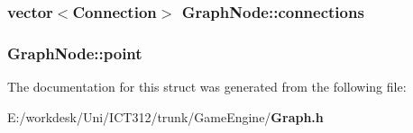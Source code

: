 \subsubsection[{connections}]{\setlength{\rightskip}{0pt plus 5cm}vector$<${\bf Connection}$>$ Graph\+Node\+::connections}\label{struct_graph_node_a82d4f743a136676d6027b5efff49555b}
\subsubsection[{point}]{ Graph\+Node\+::point}\label{struct_graph_node_ab3089f1db34b7e3bbb5f4a7a7d41de00}


The documentation for this struct was generated from the following file\+:\begin{DoxyCompactItemize}
\item 
E\+:/workdesk/\+Uni/\+I\+C\+T312/trunk/\+Game\+Engine/{\bf Graph.\+h}\end{DoxyCompactItemize}
